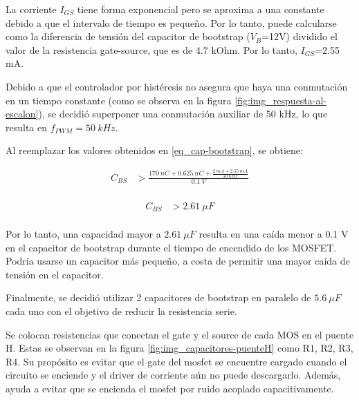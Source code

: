 \noindent La corriente $I_{GS}$ tiene forma exponencial pero se aproxima a una constante debido a que el intervalo de tiempo es pequeño. Por lo tanto, puede calcularse como la diferencia de tensión del capacitor de bootstrap ($V_B$=12V) dividido el valor de la resistencia gate-source, que es de 4.7 kOhm. Por lo tanto, $I_{GS}$=2.55 mA. 

\noindent Debido a que el controlador por histéresis no asegura que haya una conmutación en un tiempo constante (como se observa en la figura \ref{fig:img_respuesta-al-escalon}), se decidió superponer una conmutación auxiliar de 50 kHz, lo que resulta en $f_{PWM}=50 \:kHz$. 

\noindent Al reemplazar los valores obtenidos en \ref{eq_cap-bootstrap}, se obtiene:

\begin{equation*} 
	\begin{aligned}
		C_{BS} &> \frac{170 \:nC + 0.625\:nC + \frac{2 \:mA + 2.55 \:mA}{50 \:kHz}}{0.1 \:V}\\
	\end{aligned}
\end{equation*}

\begin{equation*} 
	\begin{aligned}
		C_{BS} &> 2.61 \:\mu F\\	
	\end{aligned}
\end{equation*}


\noindent Por lo tanto, una capacidad mayor a $2.61 \:\mu F$ resulta en una caída menor a 0.1 V en el capacitor de bootstrap durante el tiempo de encendido de los MOSFET. Podría usarse un capacitor más pequeño, a costa de permitir una mayor caída de tensión en el capacitor. 

\noindent Finalmente, se decidió utilizar 2 capacitores de bootstrap en paralelo de $5.6 \:\mu F$ cada uno con el objetivo de reducir la resistencia serie.


 \label{secc_res_gate_source}

\noindent Se colocan resistencias que conectan el gate y el source de cada MOS en el puente H. Estas se observan en la figura \ref{fig:img_capacitores-puenteH} como R1, R2, R3, R4. Su propósito es evitar que el gate del mosfet se encuentre cargado cuando el circuito se enciende y el driver de corriente aún no puede descargarlo. Además, ayuda a evitar que se encienda el mosfet por ruido acoplado capacitivamente. 

